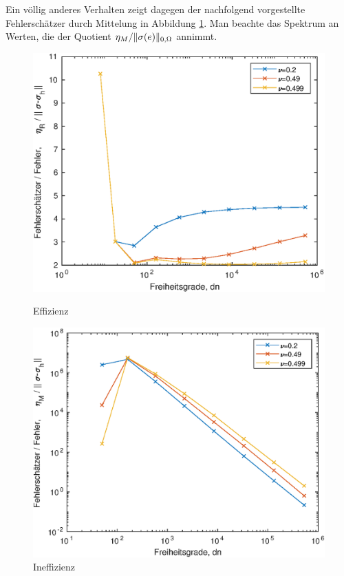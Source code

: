 \documentclass{scrartcl}
\DeclarePairedDelimiter{\norm}{\lVert}{\rVert}
\begin{document}
Ein völlig anderes Verhalten zeigt dagegen der nachfolgend vorgestellte Fehlerschätzer durch Mittelung in Abbildung \ref{pl:SquareBenchmarkInefficiency}. Man beachte das Spektrum an Werten, die der Quotient $\eta_M/\norm{\sigma(e)}_{0,\Omega}$ annimmt.


\begin{figure}[h]
\centering
\begin{minipage}[b]{0.45\textwidth}
\centering
\includegraphics[width=\textwidth]{Plots/SquareBenchmarkEfficiency1}
\caption{Effizienz}
\label{pl:SquareBenchmarkEfficiency}
\end{minipage}
\hfill
\begin{minipage}[b]{0.45\textwidth}
\centering
\includegraphics[width=\textwidth]{Plots/SquareBenchmarkInefficiency1}
\caption{Ineffizienz}
\label{pl:SquareBenchmarkInefficiency}
\end{minipage}
\end{figure}
\end{document}
